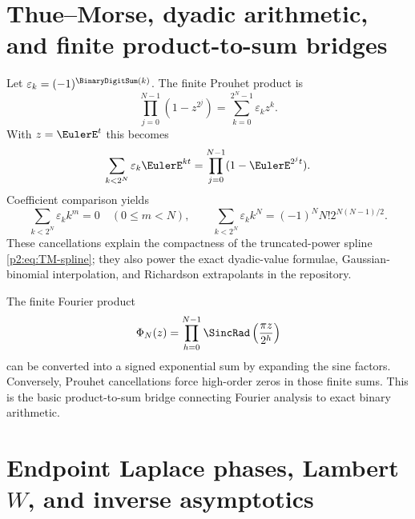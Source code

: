 \documentclass[11pt]{article}
\theoremstyle{definition}
\theoremstyle{remark}
\begin{document}
\section{Thue--Morse, dyadic arithmetic, and finite product-to-sum bridges}
\label{p2:sec:thue-morse}

Let $\varepsilon_k=(-1)^{\BinaryDigitSum(k)}$.  The finite Prouhet product is
\begin{equation}
 \prod_{j=0}^{N-1}(1-z^{2^j})
 =\sum_{k=0}^{2^N-1}\varepsilon_kz^k.                    \label{p2:eq:Prouhet-product}
\end{equation}
With $z=\EulerE^t$ this becomes
\begin{equation}
 \sum_{k<2^N}\varepsilon_k\EulerE^{kt}
 =\prod_{j=0}^{N-1}(1-\EulerE^{2^jt}).                         \label{p2:eq:Prouhet-exponential}
\end{equation}
Coefficient comparison yields
\begin{equation}
 \sum_{k<2^N}\varepsilon_kk^m=0\quad(0\le m<N),
 \qquad
 \sum_{k<2^N}\varepsilon_kk^N
 =(-1)^NN!2^{N(N-1)/2}.                                  \label{p2:eq:Prouhet-sharp}
\end{equation}
These cancellations explain the compactness of the truncated-power spline
\eqref{p2:eq:TM-spline}; they also power the exact dyadic-value formulae, Gaussian-binomial
interpolation, and Richardson extrapolants in the repository.

The finite Fourier product
\begin{equation}
 \Phi_N(z)=\prod_{h=0}^{N-1}\SincRad\left(\frac{\pi z}{2^h}\right)           \label{p2:eq:PhiN}
\end{equation}
can be converted into a signed exponential sum by expanding the sine factors.  Conversely,
Prouhet cancellations force high-order zeros in those finite sums.  This is the basic
product-to-sum bridge connecting Fourier analysis to exact binary arithmetic.

\section{Endpoint Laplace phases, Lambert \texorpdfstring{$W$}{W}, and inverse asymptotics}
\label{p2:sec:endpoint}
\end{document}
